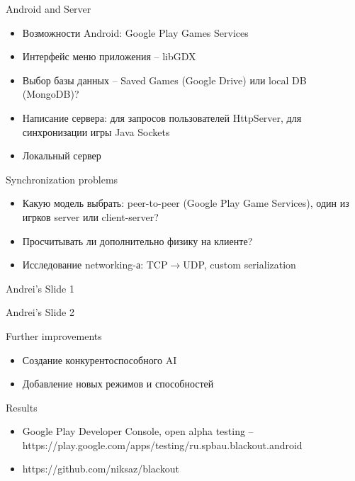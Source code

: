 \documentclass[12pt]{beamer}
\begin{document}
\begin{frame} {Android and Server}
    \begin{itemize}
        \item <1-> Возможности Android: Google Play Games Services
        \item <2-> Интерфейс меню приложения -- libGDX
        \item <3-> Выбор базы данных -- Saved Games (Google Drive) или local DB (MongoDB)?
        \item <4-> Написание сервера: для запросов пользователей HttpServer, для синхронизации игры Java Sockets
        \item <5-> Локальный сервер
    \end{itemize}
\end{frame}


\begin{frame} {Synchronization problems}
    \begin{itemize}
    	\item <1-> Какую модель выбрать: peer-to-peer (Google Play Game Services), один из игрков server или client-server?
	\item <2-> Просчитывать ли дополнительно физику на клиенте?
	\item <3-> Исследование networking-а: TCP$\rightarrow$UDP, custom serialization
    \end{itemize}
\end{frame}


\begin{frame} {Andrei's Slide 1}
\end{frame}


\begin{frame}{Andrei's Slide 2}
\end{frame}


\begin{frame}{Further improvements}
    \begin{itemize}
        \item <1-> Создание конкурентоспособного AI 
        \item <2-> Добавление новых режимов и способностей     
    \end{itemize}
\end{frame}


\begin{frame}{Results}
    \begin{itemize}
        \item <1-> Google Play Developer Console, open alpha testing -- https://play.google.com/apps/testing/ru.spbau.blackout.android 
        \item <2-> https://github.com/niksaz/blackout
    \end{itemize}

\end{frame}    
\end{document}
